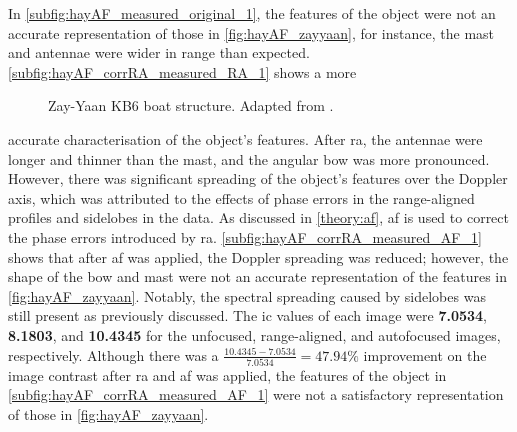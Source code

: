 \documentclass[class=report,11pt,crop=false]{standalone}
\begin{document}
    In \autoref{subfig:hayAF_measured_original_1}, the features of the object were not an accurate representation of those in \autoref{fig:hayAF_zayyaan}, for instance, the mast and antennae were wider in range than expected. \autoref{subfig:hayAF_corrRA_measured_RA_1} shows a more 
     \begin{figure}
        \centering
        \vspace*{-\baselineskip}
        \caption{Zay-Yaan KB6 boat structure. Adapted from \cite{zayyaan_data}.}
        \label{fig:hayAF_zayyaan}
        \vspace*{-\baselineskip}
    \end{figure}
    accurate characterisation of the object's features. After \gls{ra}, the antennae were longer and thinner than the mast, and the angular bow was more pronounced. However, there was significant spreading of the object's features over the Doppler axis, which was attributed to the effects of phase errors in the range-aligned profiles and sidelobes in the data. As discussed in \autoref{theory:af}, \gls{af} is used to correct the phase errors introduced by \gls{ra}. \autoref{subfig:hayAF_corrRA_measured_AF_1} shows that after \gls{af} was applied, the Doppler spreading was reduced; however, the shape of the bow and mast were not an accurate representation of the features in \autoref{fig:hayAF_zayyaan}. Notably, the spectral spreading caused by sidelobes was still present as previously discussed. The \gls{ic} values of each image were \textbf{7.0534}, \textbf{8.1803}, and \textbf{10.4345} for the unfocused, range-aligned, and autofocused images, respectively. Although there was a \(\frac{10.4345-7.0534}{7.0534} = 47.94\%\) improvement on the image contrast after \gls{ra} and \gls{af} was applied, the features of the object in \autoref{subfig:hayAF_corrRA_measured_AF_1} were not a satisfactory representation of those in \autoref{fig:hayAF_zayyaan}.
\end{document}

